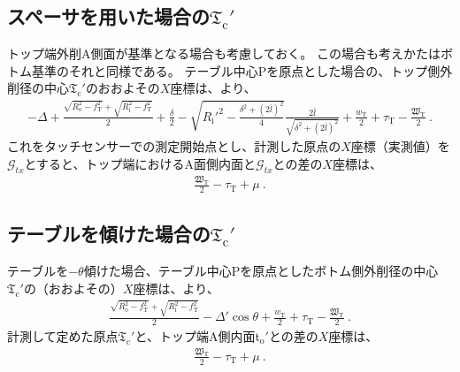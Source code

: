 \clearpage


\subsection[スペーサを用いた場合の\texorpdfstring{$\mathfrak T_\mathrm c'$}{Tc'}]
           {スペーサを用いた場合の$\boldsymbol{\mathfrak T_\mathrm c'}$}
トップ端外削A側面が基準となる場合も考慮しておく。
この場合も考えかたはボトム基準のそれと同様である。
テーブル中心Pを原点とした場合の、トップ側外削径の中心$\mathfrak T_\mathrm c'$のおおよその$X$座標は、より、
\begin{align*}
  -\varDelta+\frac{\sqrt{R_\mathrm o^2-f_\mathrm T^2}+\sqrt{R_\mathrm i^2-f_\mathrm T^2}}2+\frac\delta2
  -\sqrt{R_\mathrm i'^2-\frac{\delta^2+(2\bar l)^2}4}\frac{2\bar l}{\sqrt{\delta^2+(2\bar l)^2}}
  +\frac{w_\mathrm T}2+\tau_\mathrm T-\frac{\mathfrak W_\mathrm T}2\ .
\end{align*}
これをタッチセンサーでの測定開始点とし、計測した原点の$X$座標（実測値）を$\mathcal G_{tx}$とすると、トップ端におけるA面側内面と$\mathcal G_{tx}$との差の$X$座標は、
\begin{align*}
  \frac{\mathfrak W_\mathrm T}2-\tau_\mathrm T+\mu~.
\end{align*}


\subsection[テーブルを傾けた場合の\texorpdfstring{$\mathfrak T_\mathrm c'$}{Tc'}]
           {テーブルを傾けた場合の$\boldsymbol{\mathfrak T_\mathrm c'}$}
テーブルを$-\theta$傾けた場合、テーブル中心Pを原点としたボトム側外削径の中心$\mathfrak T_\mathrm c'$の（おおよその）$X$座標は、より、
\begin{align*}
  \frac{\sqrt{R_\mathrm o^2-f_\mathrm T^2}+\sqrt{R_\mathrm i^2-f_\mathrm T^2}}2-\varDelta'\cos\theta
  +\frac{w_\mathrm T}2+\tau_\mathrm T-\frac{\mathfrak W_\mathrm T}2\ .
\end{align*}
計測して定めた原点$\mathfrak T_\mathrm c'$と、トップ端A側内面t$_\mathrm o'$との差の$X$座標は、
\begin{align*}
  \frac{\mathfrak W_\mathrm T}2-\tau_\mathrm T+\mu~.
\end{align*}




